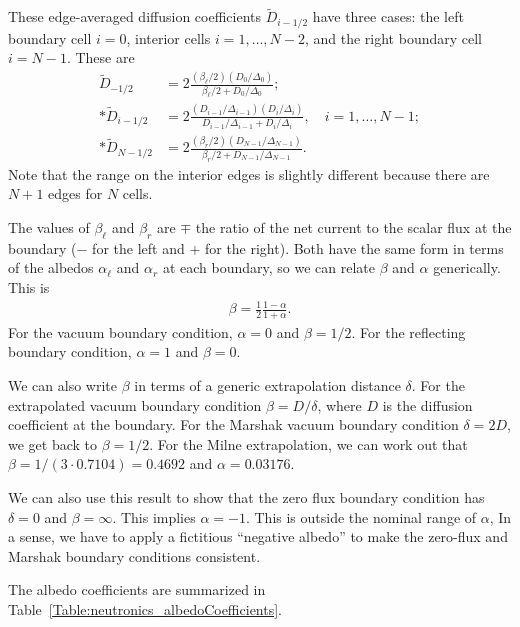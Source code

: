 These edge-averaged diffusion coefficients $\widetilde{D}_{i-1/2}$ have three cases: the left boundary cell $i = 0$, interior cells $i = 1, \ldots, N-2$, and the right boundary cell $i = N-1$. These are
\begin{subequations}
\begin{align}
  \widetilde{D}_{-1/2} 	&=  2 \frac{ ( \beta_\ell / 2 ) ( D_0 / \Delta_0 ) }{ \beta_\ell / 2 + D_0 / \Delta_0 } ; \\*
  \widetilde{D}_{i-1/2} &= 2 \frac{ ( D_{i-1} / \Delta_{i-1} ) ( D_i / \Delta_i ) }{ D_{i-1} / \Delta_{i-1} + D_i / \Delta_i } , \quad i = 1,\ldots,N-1 ; \\*
  \widetilde{D}_{N-1/2} &= 2 \frac{ ( \beta_r / 2 ) ( D_{N-1} / \Delta_{N-1} ) }{ \beta_r / 2 + D_{N-1} / \Delta_{N-1} } .
\end{align}
\end{subequations}
Note that the range on the interior edges is slightly different because there are $N+1$ edges for $N$ cells.

The values of $\beta_\ell$ and $\beta_r$ are $\mp$ the ratio of the net current to the scalar flux at the boundary ($-$ for the left and $+$ for the right). Both have the same form in terms of the albedos $\alpha_\ell$ and $\alpha_r$ at each boundary, so we can relate $\beta$ and $\alpha$ generically. This is
\begin{align}
  \beta = \frac{1}{2} \frac{ 1 - \alpha }{ 1 + \alpha } .
\end{align}
For the vacuum boundary condition, $\alpha = 0$ and $\beta = 1/2$. For the reflecting boundary condition, $\alpha = 1$ and $\beta = 0$. 

We can also write $\beta$ in terms of a generic extrapolation distance $\delta$. For the extrapolated vacuum boundary condition $\beta = D / \delta$, where $D$ is the diffusion coefficient at the boundary. For the Marshak vacuum boundary condition $\delta = 2D$, we get back to $\beta = 1/2$. For the Milne extrapolation, we can work out that $\beta = 1/ ( 3 \cdot 0.7104 ) = 0.4692$ and $\alpha = 0.03176$. 

We can also use this result to show that the zero flux boundary condition has $\delta = 0$ and $\beta = \infty$. This implies $\alpha = -1$. This is outside the nominal range of $\alpha$, In a sense, we have to apply a fictitious ``negative albedo'' to make the zero-flux and Marshak boundary conditions consistent. 

The albedo coefficients are summarized in Table~\ref{Table:neutronics_albedoCoefficients}.

